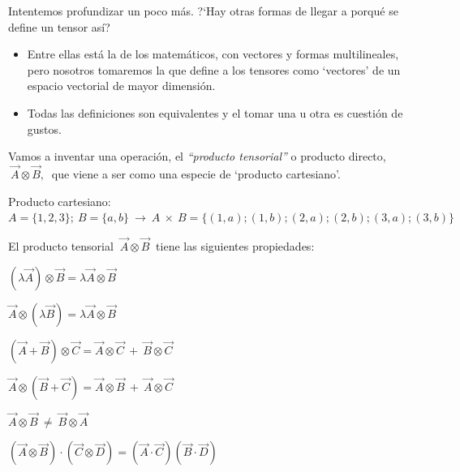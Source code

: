 Intentemos profundizar un poco más. ?`Hay otras formas de llegar a porqué se define un tensor así?
\begin{itemize}
\item Entre ellas está la de los matemáticos, con vectores y formas multilineales, pero nosotros tomaremos la que define a los tensores como `vectores' de un espacio vectorial de mayor dimensión.
\item Todas las definiciones son equivalentes y el tomar una u otra es cuestión de gustos.	
\end{itemize}

Vamos a inventar una operación, el \emph{``producto tensorial''} o producto directo, $\ \overrightarrow A \otimes \overrightarrow B,\ $ que viene a ser como una especie de `producto cartesiano'.

\textcolor{gris}{Producto cartesiano: $A=\{1,2,3\};\ B=\{a,b\} \ \to \ A\ \times \ B=\{ (1,a);(1,b);(2,a);(2,b);(3,a);(3,b) \}$}

El producto tensorial $\ \overrightarrow A \otimes \overrightarrow B\ $ tiene las siguientes propiedades:

\begin{multicols}{2}
\hspace{10mm} $(\lambda \overrightarrow A)\otimes \overrightarrow B=\lambda \overrightarrow A \otimes \overrightarrow B$

\hspace{10mm} $\overrightarrow A \otimes (\lambda \overrightarrow B )= \lambda \overrightarrow A \otimes \overrightarrow B$

\hspace{10mm} $(\overrightarrow A + \overrightarrow B)\otimes \overrightarrow C= \overrightarrow A\otimes \overrightarrow C \ + \ \overrightarrow B \otimes \overrightarrow C$

\hspace{10mm} $\overrightarrow A \otimes (\overrightarrow B + \overrightarrow C ) = \overrightarrow A\otimes \overrightarrow B \ + \ \overrightarrow A \otimes \overrightarrow C$

\hspace{10mm} $\overrightarrow A \otimes \overrightarrow B \ \boldsymbol{\neq} \ \overrightarrow B \otimes \overrightarrow A$

\hspace{10mm} $(\overrightarrow A \otimes \overrightarrow B )\cdot (\overrightarrow C \otimes \overrightarrow D) = ( \overrightarrow A \cdot \overrightarrow C)(\overrightarrow B \cdot \overrightarrow D) $
\end{multicols}

